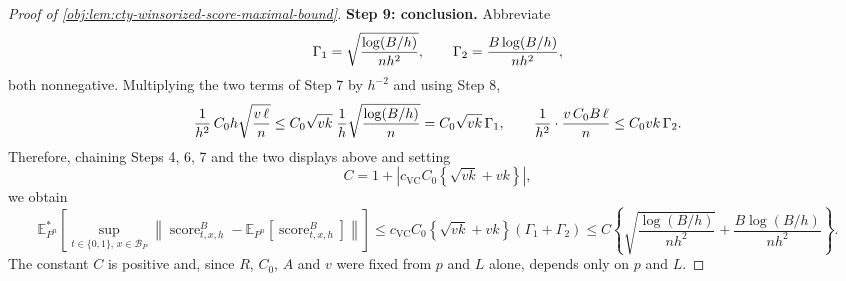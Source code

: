 \begin{proof}[Proof of \cref{obj:lem:cty-winsorized-score-maximal-bound}]
\textbf{Step 9: conclusion.}  Abbreviate
\[
\Gamma_1=\sqrt{{\log(B/h)\over nh^{2}}},
\qquad
\Gamma_2={B\log(B/h)\over nh^{2}},
\]
both nonnegative.  Multiplying the two terms of Step 7 by \(h^{-2}\) and using Step 8,
\[
{1\over h^{2}}\,C_0h\sqrt{{v\,\ell\over n}}
\leq
C_0\sqrt{vk}\;{1\over h}\sqrt{{\log(B/h)\over n}}
=
C_0\sqrt{vk}\,\Gamma_1,
\qquad
{1\over h^{2}}\cdot{v\,C_0B\,\ell\over n}
\leq
C_0vk\,\Gamma_2 .
\]
Therefore, chaining Steps 4, 6, 7 and the two displays above and setting
\[
C=1+\left|c_{\mathrm{VC}}C_0\left\{\sqrt{vk}+vk\right\}\right|,
\]
we obtain
\[
\mathbb E_{P^n}^{*}\!\left[
\sup_{t\in\{0,1\},\,x\in\mathcal B_P}
\left\lVert
\operatorname{score}^{B}_{t,x,h}
-\mathbb E_{P^n}\!\left[\operatorname{score}^{B}_{t,x,h}\right]
\right\rVert
\right]
\leq
c_{\mathrm{VC}}C_0\left\{\sqrt{vk}+vk\right\}(\Gamma_1+\Gamma_2)
\leq
C\left\{
\sqrt{\frac{\log(B/h)}{n h^2}}
+
\frac{B\log(B/h)}{n h^2}
\right\}.
\]
The constant \(C\) is positive and, since \(R\), \(C_0\), \(A\) and \(v\) were fixed from \(p\) and \(L\) alone, depends only on \(p\) and \(L\).
\end{proof}
